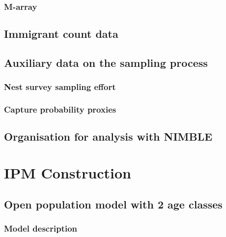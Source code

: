 \documentclass[
]{book}
\begin{document}
\hypertarget{m-array}{%
\subsection{M-array}\label{m-array}}

\hypertarget{immigrant-count-data}{%
\section{Immigrant count data}\label{immigrant-count-data}}

\hypertarget{auxiliary-data-on-the-sampling-process}{%
\section{Auxiliary data on the sampling process}\label{auxiliary-data-on-the-sampling-process}}

\hypertarget{nest-survey-sampling-effort}{%
\subsection{Nest survey sampling effort}\label{nest-survey-sampling-effort}}

\hypertarget{capture-probability-proxies}{%
\subsection{Capture probability proxies}\label{capture-probability-proxies}}

\hypertarget{organisation-for-analysis-with-nimble}{%
\section{Organisation for analysis with NIMBLE}\label{organisation-for-analysis-with-nimble}}

\hypertarget{IPMCon}{%
\chapter{IPM Construction}\label{IPMCon}}

\hypertarget{open-population-model-with-2-age-classes}{%
\section{Open population model with 2 age classes}\label{open-population-model-with-2-age-classes}}

\hypertarget{model-description}{%
\subsection{Model description}\label{model-description}}
\end{document}

